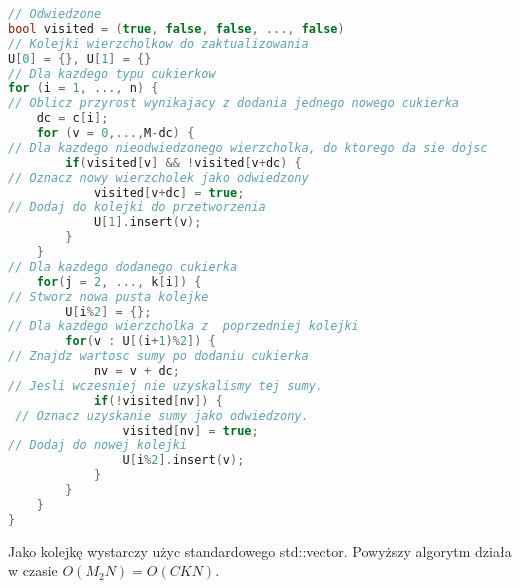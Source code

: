 \documentclass[paper=a4, fontsize=11pt]{article}
\begin{document}
\begin{lstlisting}[language=c++, breaklines=True]
// Odwiedzone
bool visited = (true, false, false, ..., false)
// Kolejki wierzcholkow do zaktualizowania
U[0] = {}, U[1] = {} 
// Dla kazdego typu cukierkow
for (i = 1, ..., n) {
// Oblicz przyrost wynikajacy z dodania jednego nowego cukierka
	dc = c[i];
	for (v = 0,...,M-dc) {
// Dla kazdego nieodwiedzonego wierzcholka, do ktorego da sie dojsc
		if(visited[v] && !visited[v+dc) {
// Oznacz nowy wierzcholek jako odwiedzony
			visited[v+dc] = true;
// Dodaj do kolejki do przetworzenia
			U[1].insert(v);
		}
	}
// Dla kazdego dodanego cukierka
	for(j = 2, ..., k[i]) {
// Stworz nowa pusta kolejke
		U[i%2] = {};
// Dla kazdego wierzcholka z  poprzedniej kolejki
		for(v : U[(i+1)%2]) {
// Znajdz wartosc sumy po dodaniu cukierka
			nv = v + dc; 
// Jesli wczesniej nie uzyskalismy tej sumy.
			if(!visited[nv]) {
 // Oznacz uzyskanie sumy jako odwiedzony.
				visited[nv] = true;
// Dodaj do nowej kolejki
				U[i%2].insert(v);
			}			
		}
	}
}
\end{lstlisting}

Jako kolejkę wystarczy użyc standardowego std::vector.
Powyższy algorytm działa w czasie $O(M_2N) = O(CKN)$.
\end{document}
